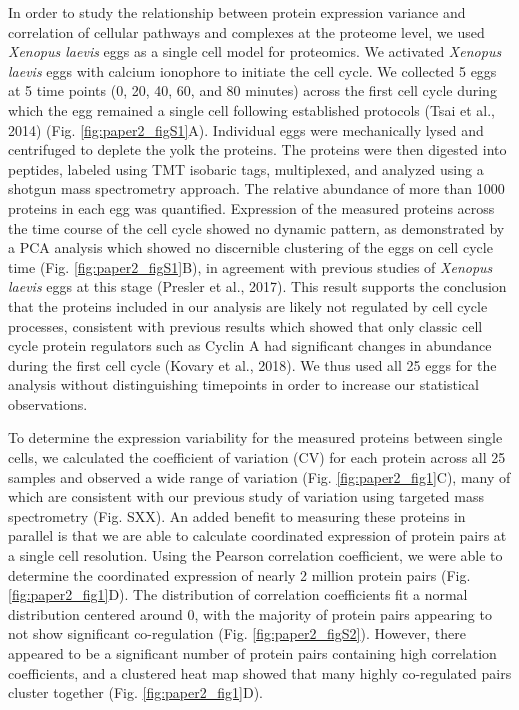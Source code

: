 In order to study the relationship between protein expression variance and correlation of cellular pathways and complexes at the proteome level, we used \emph{Xenopus laevis} eggs as a single cell model for proteomics. We activated \emph{Xenopus laevis} eggs with calcium ionophore to initiate the cell cycle. We collected 5 eggs at 5 time points (0, 20, 40, 60, and 80 minutes) across the first cell cycle during which the egg remained a single cell following established protocols (Tsai et al., 2014)  (Fig. \ref{fig:paper2_figS1}A). Individual eggs were mechanically lysed and centrifuged to deplete the yolk the proteins. The proteins were then digested into peptides, labeled using TMT isobaric tags, multiplexed, and analyzed using a shotgun mass spectrometry approach. The relative abundance of more than 1000 proteins in each egg was quantified. Expression of the measured proteins across the time course of the cell cycle showed no dynamic pattern, as demonstrated by a PCA analysis which showed no discernible clustering of the eggs on cell cycle time (Fig. \ref{fig:paper2_figS1}B), in agreement with previous studies of \emph{Xenopus laevis} eggs at this stage (Presler et al., 2017). This result supports the conclusion that the proteins included in our analysis are likely not regulated by cell cycle processes, consistent with previous results which showed that only classic cell cycle protein regulators such as Cyclin A had significant changes in abundance during the first cell cycle (Kovary et al., 2018).  We thus used all 25 eggs for the analysis without distinguishing timepoints in order to increase our statistical observations.

To determine the expression variability for the measured proteins between single cells, we calculated the coefficient of variation (CV) for each protein across all 25 samples and observed a wide range of variation (Fig. \ref{fig:paper2_fig1}C), many of which are consistent with our previous study of variation using targeted mass spectrometry (Fig. SXX). An added benefit to measuring these proteins in parallel is that we are able to calculate coordinated expression of protein pairs at a single cell resolution. Using the Pearson correlation coefficient, we were able to determine the coordinated expression of nearly 2 million protein pairs (Fig. \ref{fig:paper2_fig1}D). The distribution of correlation coefficients fit a normal distribution centered around 0, with the majority of protein pairs appearing to not show significant co-regulation (Fig. \ref{fig:paper2_figS2}). However, there appeared to be a significant number of protein pairs containing high correlation coefficients, and a clustered heat map showed that many highly co-regulated pairs cluster together (Fig. \ref{fig:paper2_fig1}D).

